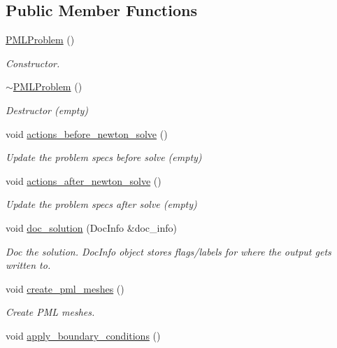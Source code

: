 \subsection*{Public Member Functions}
\begin{DoxyCompactItemize}
\item 
\hyperlink{classPMLProblem_ae6cc833e2485ad6d37d6dd14105bf407}{P\+M\+L\+Problem} ()
\begin{DoxyCompactList}\small\item\em Constructor. \end{DoxyCompactList}\item 
\hyperlink{classPMLProblem_a4922fc5b0ef4cf43c41ee9149712adb1}{$\sim$\+P\+M\+L\+Problem} ()
\begin{DoxyCompactList}\small\item\em Destructor (empty) \end{DoxyCompactList}\item 
void \hyperlink{classPMLProblem_a13feb001d09f64dcfe44bbe3c6fe3d97}{actions\+\_\+before\+\_\+newton\+\_\+solve} ()
\begin{DoxyCompactList}\small\item\em Update the problem specs before solve (empty) \end{DoxyCompactList}\item 
void \hyperlink{classPMLProblem_ac171a6a2ff881984b3e057036cbbc414}{actions\+\_\+after\+\_\+newton\+\_\+solve} ()
\begin{DoxyCompactList}\small\item\em Update the problem specs after solve (empty) \end{DoxyCompactList}\item 
void \hyperlink{classPMLProblem_ae04985b020a9e0526ab829ca316adb26}{doc\+\_\+solution} (Doc\+Info \&doc\+\_\+info)
\begin{DoxyCompactList}\small\item\em Doc the solution. Doc\+Info object stores flags/labels for where the output gets written to. \end{DoxyCompactList}\item 
void \hyperlink{classPMLProblem_aa111bfe53d52cf6b2e1bb3b079c16d43}{create\+\_\+pml\+\_\+meshes} ()
\begin{DoxyCompactList}\small\item\em Create P\+ML meshes. \end{DoxyCompactList}\item 
void \hyperlink{classPMLProblem_a2d2cdf5c1e99a7600d91353fd0584d5c}{apply\+\_\+boundary\+\_\+conditions} ()

\end{DoxyCompactItemize}
